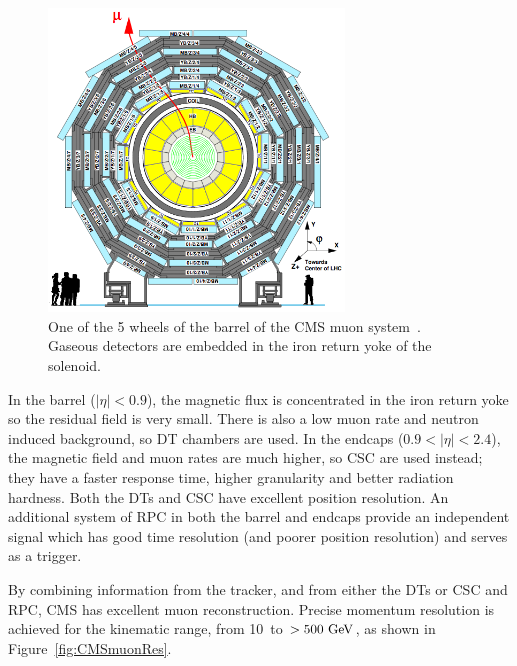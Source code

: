 \begin{figure}[htbp]
  \begin{center}
  \includegraphics[width=0.7\textwidth]{Figures/detector/muonSystems}
  \caption{One of the 5 wheels of the barrel of the \ac{CMS} muon system~\cite{Chatrchyan:2008zzk}. Gaseous detectors are embedded in the iron return yoke of the solenoid.
}
  \label{fig:CMSmuonSys}
  \end{center}
\end{figure}



In the barrel ($|\eta|<0.9$), the magnetic flux is concentrated in the iron return yoke so the residual field is very small.
There is also a low muon rate and neutron induced background, so \ac{DT} chambers are used.
In the endcaps ($0.9<|\eta|<2.4$), the magnetic field and muon rates are much higher, so \ac{CSC} are used instead; 
they have a faster response time, higher granularity and better radiation hardness.
Both the \ac{DT}s and \ac{CSC} have excellent position resolution.
An additional system of \ac{RPC} in both the barrel and endcaps provide an independent signal which has good time resolution (and poorer position resolution) and serves as a trigger.


By combining information from the tracker, and from either the \ac{DT}s or \ac{CSC} and \ac{RPC}, \ac{CMS} has excellent muon reconstruction. 
Precise momentum resolution is achieved for the kinematic range, from 10~\GeV to $>500~\mathrm{GeV}$, as shown in  
Figure~\ref{fig:CMSmuonRes}. 

